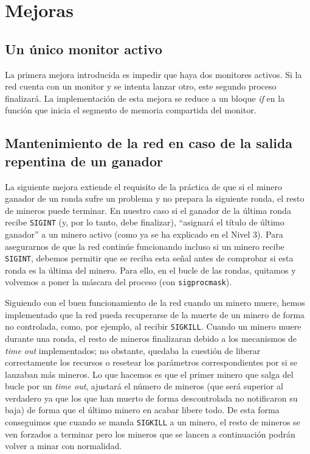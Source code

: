 \documentclass{article}
\begin{document}
\section*{Mejoras}

\subsection*{Un único monitor activo}
La primera mejora introducida es impedir que haya dos monitores activos. Si la red cuenta con un monitor y se intenta lanzar otro, este segundo proceso finalizará. La implementación de esta mejora se reduce a un bloque \emph{if} en la función que inicia el segmento de memoria compartida del monitor.

\subsection*{Mantenimiento de la red en caso de la salida repentina de un ganador}
La siguiente mejora extiende el requisito de la práctica de que si el minero ganador de un ronda sufre un problema y no prepara la siguiente ronda, el resto de mineros puede terminar. En nuestro caso si el ganador de la última ronda recibe \texttt{SIGINT} (y, por lo tanto, debe finalizar), ``asignará el título de último ganador'' a un minero activo (como ya se ha explicado en el Nivel 3). Para asegurarnos de que la red continúe funcionando incluso si un minero recibe \texttt{SIGINT}, debemos permitir que se reciba esta señal antes de comprobar si esta ronda es la última del minero. Para ello, en el bucle de las rondas, quitamos y volvemos a poner la máscara del proceso (con \texttt{sigprocmask}). 

Siguiendo con el buen funcionamiento de la red cuando un minero muere, hemos implementado que la red pueda recuperarse de la muerte de un minero de forma no controlada, como, por ejemplo, al recibir \texttt{SIGKILL}. Cuando un minero muere durante una ronda, el resto de mineros finalizaran debido a los mecanismos de \textit{time out} implementados; no obstante, quedaba la cuestión de liberar correctamente los recursos o resetear los parámetros correspondientes por si se lanzaban más mineros. Lo que hacemos es que el primer minero que salga del bucle por un \textit{time out}, ajustará el número de mineros (que será superior al verdadero ya que los que han muerto de forma descontrolada no notificaron su baja) de forma que el último minero en acabar libere todo. De esta forma conseguimos que cuando se manda \texttt{SIGKILL} a un minero, el resto de mineros se ven forzados a terminar pero los mineros que se lancen a continuación podrán volver a minar con normalidad.
\end{document}
